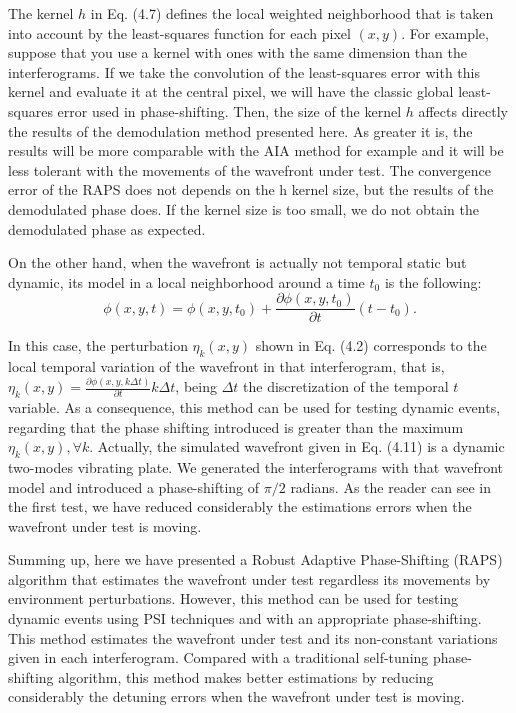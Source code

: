The kernel $h$ in Eq. (4.7) defines the local weighted neighborhood that is
taken into account by the least-squares function for each pixel $(x,y)$. For
example, suppose that you use a kernel with ones with the same dimension than
the interferograms. If we take the convolution of the least-squares error with
this kernel and evaluate it at the central pixel, we will have the classic
global least-squares error used in phase-shifting. Then, the size of the kernel
$h$ affects directly the results of the demodulation method presented here. As
greater it is, the results will be more comparable with the AIA method for
example and it will be less tolerant with the movements of the wavefront under
test. The convergence error of the RAPS does not depends on the h kernel
size, but the results of the demodulated phase does. If the kernel size is too
small, we do not obtain the demodulated phase as expected.

On the other hand, when the wavefront is actually not temporal static but
dynamic, its model in a local neighborhood around a time $t_0$ is the following:
\begin{equation}
 \phi(x,y,t)= \phi(x,y,t_0) + \frac{\partial \phi(x,y,t_0) }{\partial t}
 (t-t_0).
\end{equation}

In this case, the perturbation $\eta_k(x,y)$ shown in Eq. (4.2) corresponds to
the local temporal variation of the wavefront in that interferogram, that is,
$\eta_k (x,y)= \frac{\partial \phi(x,y,k\Delta t)}{\partial t} k \Delta t$,
being $\Delta t$ the discretization of the temporal $t$ variable. As a
consequence, this method can be used for testing dynamic events, regarding that
the phase shifting introduced is greater than the maximum $\eta_k(x,y),\forall
k$. Actually, the simulated wavefront given in Eq. (4.11) is a dynamic
two-modes vibrating plate. We generated the interferograms with that wavefront
model and introduced a phase-shifting of $\pi/2$ radians. As the reader can
see in the first test, we have reduced considerably the estimations errors when
the wavefront under test is moving.

Summing up, here we have presented a Robust Adaptive Phase-Shifting (RAPS)
algorithm that estimates the wavefront under test regardless its movements by
environment perturbations. However, this method can be used for testing dynamic
events using PSI techniques and with an appropriate phase-shifting. This method
estimates the wavefront under test and its non-constant variations given in each
interferogram. Compared with a traditional self-tuning phase-shifting algorithm,
this method makes better estimations by reducing considerably the detuning
errors when the wavefront under test is moving.